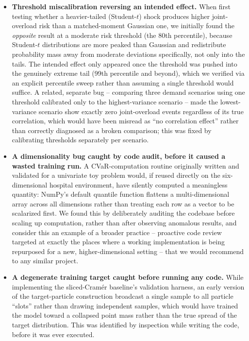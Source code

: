 \documentclass[11pt]{article}
\begin{document}
\begin{itemize}[leftmargin=*]
\item \textbf{Threshold miscalibration reversing an intended effect.} When first testing whether a heavier-tailed (Student-$t$) shock produces higher joint-overload risk than a matched-moment Gaussian one, we initially found the \emph{opposite} result at a moderate risk threshold (the 80th percentile), because Student-$t$ distributions are more peaked than Gaussian and redistribute probability mass away from moderate deviations specifically, not only into the tails. The intended effect only appeared once the threshold was pushed into the genuinely extreme tail (99th percentile and beyond), which we verified via an explicit percentile sweep rather than assuming a single threshold would suffice. A related, separate bug -- comparing three demand scenarios using one threshold calibrated only to the highest-variance scenario -- made the lowest-variance scenario show exactly zero joint-overload events regardless of its true correlation, which would have been misread as ``no correlation effect'' rather than correctly diagnosed as a broken comparison; this was fixed by calibrating thresholds separately per scenario.
\item \textbf{A dimensionality bug caught by code audit, before it caused a wasted training run.} A CVaR-computation routine originally written and validated for a univariate toy problem would, if reused directly on the six-dimensional hospital environment, have silently computed a meaningless quantity: NumPy's default quantile function flattens a multi-dimensional array across all dimensions rather than treating each row as a vector to be scalarized first. We found this by deliberately auditing the codebase before scaling up computation, rather than after observing anomalous results, and consider this an example of a broader practice -- proactive code review targeted at exactly the places where a working implementation is being repurposed for a new, higher-dimensional setting -- that we would recommend to any similar project.
\item \textbf{A degenerate training target caught before running any code.} While implementing the sliced-Cram\'er baseline's validation harness, an early version of the target-particle construction broadcast a single sample to all particle ``slots'' rather than drawing independent samples, which would have trained the model toward a collapsed point mass rather than the true spread of the target distribution. This was identified by inspection while writing the code, before it was ever executed.
\end{itemize}
\end{document}

